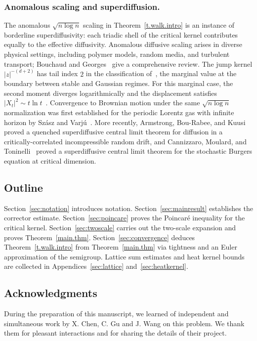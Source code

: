 \documentclass[11pt]{amsart}
\theoremstyle{plain}
\theoremstyle{definition}
\theoremstyle{remark}
\begin{document}
	\subsubsection{Anomalous scaling and superdiffusion.}
	The anomalous $\sqrt{n \log n}$ scaling in Theorem~\ref{t.walk.intro} is an instance of borderline superdiffusivity: each triadic shell of the critical kernel contributes equally to the effective diffusivity.
	Anomalous diffusive scaling arises in diverse physical settings, including polymer models, random media, and turbulent transport; Bouchaud and Georges~\cite{BouchaudGeorges1990} give a comprehensive review.
	The jump kernel $|z|^{-(d+2)}$ has tail index $2$ in the classification of~\cite[Section~1.2]{BouchaudGeorges1990}, the marginal value at the boundary between stable and Gaussian regimes.
	For this marginal case, the second moment diverges logarithmically and the displacement satisfies $|X_t|^2 \sim t \ln t$~\cite[eq.~(1.19)]{BouchaudGeorges1990}.
	Convergence to Brownian motion under the same $\sqrt{n \log n}$ normalization was first established for the periodic Lorentz gas with infinite horizon by Sz\'asz and Varj\'u~\cite{SzaszVarju2007}.
	More recently, Armstrong, Bou-Rabee, and Kuusi~\cite{ArmstrongBouRabeeKuusi2024} proved a quenched superdiffusive central limit theorem for diffusion in a critically-correlated incompressible random drift, and Cannizzaro, Moulard, and Toninelli~\cite{CannizzaroMoulardToninelli2025} proved a superdiffusive central limit theorem for the stochastic Burgers equation at critical dimension.
	
	
	\subsection{Outline}
	
	Section~\ref{sec:notation} introduces notation.
	Section~\ref{sec:mainresult} establishes the corrector estimate.
	Section~\ref{sec:poincare} proves the Poincar\'e inequality for the critical kernel.
	Section~\ref{sec:twoscale} carries out the two-scale expansion and proves Theorem~\ref{main.thm}.
	Section~\ref{sec:convergence} deduces Theorem~\ref{t.walk.intro} from Theorem~\ref{main.thm} via tightness and an Euler approximation of the semigroup.
	Lattice sum estimates and heat kernel bounds are collected in Appendices~\ref{sec:lattice} and~\ref{sec:heatkernel}.
	
	\medskip
	
	\subsection*{Acknowledgments} During the preparation of this manuscript, we learned of independent and simultaneous work by X. Chen, C. Gu and J. Wang on this problem. We thank them for pleasant interactions and for sharing the details of their project.
	
\end{document}

